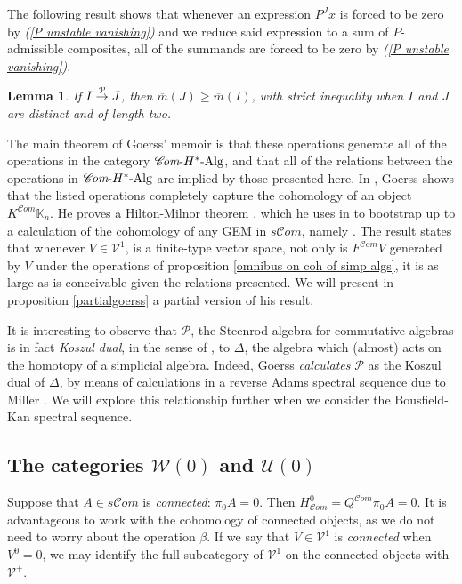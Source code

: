 \documentclass[11pt]{amsart}
\theoremstyle{plain}
\newtheorem{lem}[thm]{Lemma}
\theoremstyle{definition}
\newcommand{\scrC}{\mathscr{C}}
\newcommand{\calW}{\mathcal{W}}
\newcommand{\calU}{\mathcal{U}}
\newcommand{\calP}{\mathcal{P}}
\newcommand{\calV}{\mathcal{V}}
\theoremstyle{plain}
\newcommand{\Palg}{{\calP}}
\newcommand{\deltaalg}{\Delta} %
\newcommand{\vect}[2]{\calV^{#1}_{#2}}
\newcommand{\HAlg}{\textup{-$H^*$-Alg}}
\newcommand{\minDimP}{\overline{m}}
\newcommand{\produces}[3]{#3:#1\sim #2}
\renewcommand{\produces}[3]{#1\rightarrow_{#3} #2}%
\renewcommand{\produces}[3]{#1\overset{\smash{#3}}{\rightarrow} #2}%
\newcommand{\algs}{{\scrC\!\textit{om}}}
\begin{document}
\begin{Constructing (co)homotopy operations}
The following result shows that whenever an expression $P^Jx$ is forced to be zero by \emph{(\ref{P unstable vanishing})}  and we reduce said expression to a sum of $P$-admissible composites, all of the summands are forced to be zero by \emph{(\ref{P unstable vanishing})}.
\begin{lem}\label{lemOnAdemChangeInMP}
If $\produces{I}{J}{\Palg}$, then $\minDimP(J) \geq \minDimP(I)$, with strict inequality when $I$ and $J$ are distinct and of length two.
\end{lem}
The main theorem of Goerss' memoir is that these operations generate all of the operations in the category $\algs\HAlg$, and that all of the relations between the operations in $\algs\HAlg$ are implied by those presented here. In \cite[Chapter V]{MR1089001}, Goerss shows that the listed operations completely capture the cohomology of an object $K^{\algs}\mathbb{K}_n$. He proves a Hilton-Milnor theorem \cite{GoerssHiltonMilnor.pdf}, which he uses in \cite[\S11]{MR1089001} to bootstrap up to a calculation of the cohomology of any GEM in $s\algs$, namely \cite[Theorem I]{MR1089001}. The result states that whenever $V\in \vect{1}{}$,  is a finite-type vector space, not only is 
$F^{\algs}V$
generated by $V$ under the operations of proposition \ref{omnibus on coh of simp algs}, it is as large as is conceivable given the relations presented. We will present in proposition \ref{partialgoerss} a partial version of his result.

It is  interesting to observe that $\Palg$, the Steenrod algebra for commutative algebras is
in fact \emph{Koszul dual}, in the sense of \cite{PriddyKoszul.pdf}, to $\deltaalg$, the algebra which (almost) acts on the homotopy of a simplicial algebra. Indeed, Goerss \emph{calculates} $\Palg$ as the Koszul dual of $\deltaalg$, by means of calculations in a reverse Adams spectral sequence due to Miller \cite{MillerSullivanConjecture.pdf}. We will explore this relationship further when we consider the Bousfield-Kan spectral sequence.

\subsection{The categories $\calW(0)$ and $\calU(0)$}
Suppose that $A\in s\algs$ is \emph{connected}: $\pi_0A=0$. Then $H^0_{\algs}=Q^{\algs}\pi_0A=0$. It is advantageous to work with the cohomology of connected objects, as we do not need to worry about the operation $\beta$. If we say that $V\in \vect{1}{}$ is \emph{connected} when $V^{0}=0$, we may identify the full subcategory of $\vect{1}{}$ on the connected objects with $\vect{+}{}$.


\end{Constructing (co)homotopy operations}
\end{document}
